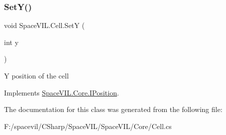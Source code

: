 \subsubsection{\texorpdfstring{Set\+Y()}{SetY()}}
{\footnotesize\ttfamily void Space\+V\+I\+L.\+Cell.\+SetY (\begin{DoxyParamCaption}\item[{int}]{y }\end{DoxyParamCaption})\hspace{0.3cm}{\ttfamily [inline]}}



Y position of the cell 



Implements \mbox{\hyperlink{interface_space_v_i_l_1_1_core_1_1_i_position}{Space\+V\+I\+L.\+Core.\+I\+Position}}.



The documentation for this class was generated from the following file\+:\begin{DoxyCompactItemize}
\item 
F\+:/spacevil/\+C\+Sharp/\+Space\+V\+I\+L/\+Space\+V\+I\+L/\+Core/Cell.\+cs\end{DoxyCompactItemize}
